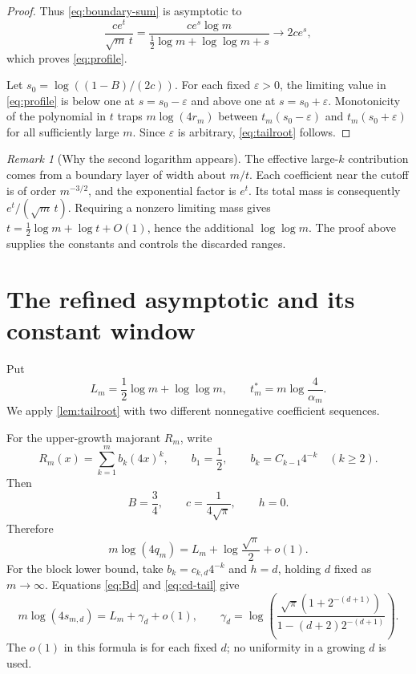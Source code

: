 \documentclass[11pt,a4paper]{article}
\theoremstyle{definition}\newaliascnt{definition}{theorem}
\theoremstyle{remark}\newaliascnt{remark}{theorem}
\newtheorem{remark}[remark]{Remark}
\newcommand{\eps}{\varepsilon}
\begin{document}
\begin{proof}
Thus \eqref{eq:boundary-sum} is asymptotic to
\[
 \frac{c e^t}{\sqrt m\,t}
 =\frac{c e^s\log m}{\frac12\log m+\log\log m+s}
 \longrightarrow 2ce^s,
\]
which proves \eqref{eq:profile}.

Let $s_0=\log((1-B)/(2c))$. For each fixed $\eps>0$, the limiting value in
\eqref{eq:profile} is below one at $s=s_0-\eps$ and above one at
$s=s_0+\eps$. Monotonicity of the polynomial in $t$ traps
$m\log(4r_m)$ between $t_m(s_0-\eps)$ and $t_m(s_0+\eps)$ for all sufficiently
large $m$. Since $\eps$ is arbitrary, \eqref{eq:tailroot} follows.
\end{proof}

\begin{remark}[Why the second logarithm appears]
The effective large-$k$ contribution comes from a boundary layer of width
about $m/t$. Each coefficient near the cutoff is of order $m^{-3/2}$,
and the exponential factor is $e^t$. Its total mass is consequently
$e^t/(\sqrt m\,t)$. Requiring a nonzero limiting mass gives
$t=\frac12\log m+\log t+O(1)$, hence the additional $\log\log m$.
The proof above supplies the constants and controls the discarded ranges.
\end{remark}

\section{The refined asymptotic and its constant window}
\label{sec:asympt}
Put
\[
 L_m=\frac12\log m+\log\log m,
 \qquad t_m^*=m\log\frac4{\alpha_m}.
\]
We apply \cref{lem:tailroot} with two different nonnegative coefficient
sequences.

For the upper-growth majorant $R_m$, write
\[
 R_m(x)=\sum_{k=1}^m b_k(4x)^k,\qquad
 b_1=\frac12,\qquad b_k=C_{k-1}4^{-k}\quad(k\ge2).
\]
Then
\[
 B=\frac34,\qquad c=\frac1{4\sqrt\pi},\qquad h=0.
\]
Therefore
\begin{equation}
 m\log(4q_m)=L_m+\log\frac{\sqrt\pi}{2}+o(1).
 \label{eq:q-asympt}
\end{equation}
For the block lower bound, take $b_k=c_{k,d}4^{-k}$ and $h=d$, holding $d$
fixed as $m\to\infty$. Equations \eqref{eq:Bd} and \eqref{eq:cd-tail} give
\begin{equation}
 m\log(4s_{m,d})=L_m+\gamma_d+o(1),
 \qquad
 \gamma_d=
 \log\!\left(
 \frac{\sqrt\pi(1+2^{-(d+1)})}{1-(d+2)2^{-(d+1)}}\right).
 \label{eq:s-asympt}
\end{equation}
The $o(1)$ in this formula is for each fixed $d$; no uniformity in a growing
$d$ is used.
\end{document}
